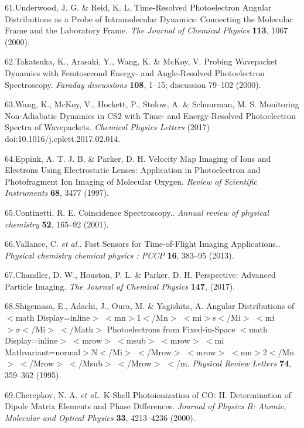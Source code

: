 \documentclass[10pt]{article}
\begin{document}
\label{csl:61}61.Underwood, J. G. \& Reid, K. L. {Time-Resolved Photoelectron Angular Distributions as a Probe of Intramolecular Dynamics: {{Connecting}} the Molecular Frame and the Laboratory Frame}. \textit{The Journal of Chemical Physics} \textbf{113}, 1067 (2000).

\label{csl:62}62.Takatsuka, K., Arasaki, Y., Wang, K. \& McKoy, V. {Probing Wavepacket Dynamics with Femtosecond Energy- and Angle-Resolved Photoelectron Spectroscopy}. \textit{Faraday discussions} \textbf{108}, 1–15; discussion 79–102 (2000).

\label{csl:63}63.Wang, K., McKoy, V., Hockett, P., Stolow, A. \& Schuurman, M. S. {Monitoring Non-Adiabatic Dynamics in {{CS2}} with Time- and Energy-Resolved Photoelectron Spectra of Wavepackets}. \textit{Chemical Physics Letters} (2017) doi:10.1016/j.cplett.2017.02.014.

\label{csl:64}64.Eppink, A. T. J. B. \& Parker, D. H. {Velocity Map Imaging of Ions and Electrons Using Electrostatic Lenses: {{Application}} in Photoelectron and Photofragment Ion Imaging of Molecular Oxygen}. \textit{Review of Scientific Instruments} \textbf{68}, 3477 (1997).

\label{csl:65}65.Continetti, R. E. {Coincidence Spectroscopy.}. \textit{Annual review of physical chemistry} \textbf{52}, 165–92 (2001).

\label{csl:66}66.Vallance, C. \textit{et al.}. {Fast Sensors for Time-of-Flight Imaging Applications.}. \textit{Physical chemistry chemical physics : PCCP} \textbf{16}, 383–95 (2013).

\label{csl:67}67.Chandler, D. W., Houston, P. L. \& Parker, D. H. {Perspective: {{Advanced}} Particle Imaging}. \textit{The Journal of Chemical Physics} \textbf{147}, (2017).

\label{csl:68}68.Shigemasa, E., Adachi, J., Oura, M. \& Yagishita, A. {Angular {{Distributions}} of {$<$}math Display=inline{$>$} {$<$}mn{$>$}1{$<$}/Mn{$>$} {$<$}mi{$>$}s{$<$}/Mi{$>$} {$<$}mi{$>\sigma<$}/Mi{$>$} {$<$}/Math{$>$} {{Photoelectrons}} from {{Fixed}}-in-{{Space}} {$<$}math Display=inline{$>$} {$<$}mrow{$>$} {$<$}msub{$>$} {$<$}mrow{$>$} {$<$}mi Mathvariant=normal{$>$}{{N}}{$<$}/Mi{$>$} {$<$}/Mrow{$>$} {$<$}mrow{$>$} {$<$}mn{$>$}2{$<$}/Mn{$>$} {$<$}/Mrow{$>$} {$<$}/Msub{$>$} {$<$}/Mrow{$>$} {$<$}/m}. \textit{Physical Review Letters} \textbf{74}, 359–362 (1995).

\label{csl:69}69.Cherepkov, N. A. \textit{et al.}. {K-Shell Photoionization of {{CO}}: {{II}}. {{Determination}} of Dipole Matrix Elements and Phase Differences}. \textit{Journal of Physics B: Atomic, Molecular and Optical Physics} \textbf{33}, 4213–4236 (2000).
\end{document}
